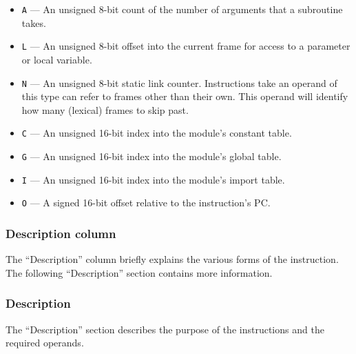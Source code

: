 \begin{itemize}
    \item \texttt{A} --- An unsigned 8-bit count of the number of arguments that a subroutine takes.
    \item \texttt{L} --- An unsigned 8-bit offset into the current frame for access to a parameter or local variable.
    \item \texttt{N} --- An unsigned 8-bit static link counter. Instructions take an operand of this type can refer to frames other than their own. This operand will identify how many (lexical) frames to skip past.
    \item \texttt{C} --- An unsigned 16-bit index into the module's constant table.
    \item \texttt{G} --- An unsigned 16-bit index into the module's global table.
    \item \texttt{I} --- An unsigned 16-bit index into the module's import table.
    \item \texttt{O} --- A signed 16-bit offset relative to the instruction's PC.
\end{itemize}

\subsubsection{Description column}

The ``Description'' column briefly explains the various forms of the instruction. The following ``Description'' section contains more information.

\subsubsection{Description}

The ``Description'' section describes the purpose of the instructions and the required operands.

\newenvironment{instruction}[2] {
        \subsubsection{#1}
        \begin{tabularx}{\linewidth}{|>{\ttfamily}l >{\ttfamily}l >{\ttfamily}l >{\ttfamily}l X|}\hline
            {\normalfont\bfseries Opcode} & \multicolumn{3}{l}{{\bfseries Instruction}} & {\bfseries Description} \\
            \hline
            #2
            \hline
        \end{tabularx}
        \subsubsection*{Description}
}{
    \par%
    \par
}

